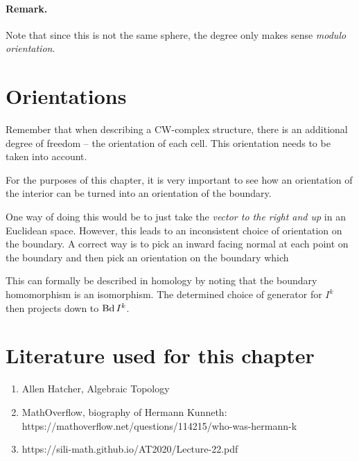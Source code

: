 \paragraph{Remark.} Note that since this is not the same sphere, the degree only makes sense \emph{modulo orientation}.

\section{Orientations}

Remember that when describing a CW-complex structure, there is an additional degree of freedom -- the orientation of each cell. This orientation needs to be taken into account.


For the purposes of this chapter, it is very important to see how an orientation of the interior can be turned into an orientation of the boundary.

One way of doing this would be to just take the \emph{vector to the right and up} in an Euclidean space. However, this leads to an inconsistent choice of orientation on the boundary. A correct way is to pick an inward facing normal at each point on the boundary and then pick an orientation on the boundary which 

This can formally be described in homology by noting that the boundary homomorphism is an isomorphism. The determined choice of generator for \( I^k \) then projects down to \( \operatorname{Bd} I^k \).

\section{Literature used for this chapter}

\begin{enumerate}
    \item Allen Hatcher, Algebraic Topology
    \item MathOverflow, biography of Hermann Kunneth: https://mathoverflow.net/questions/114215/who-was-hermann-k%
    \item https://sili-math.github.io/AT2020/Lecture-22.pdf
\end{enumerate}

